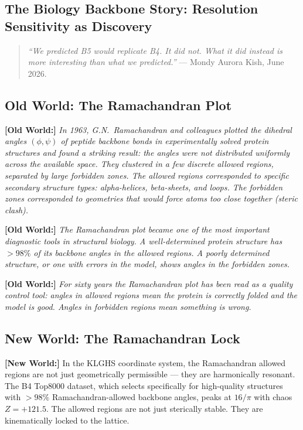 \documentclass[11pt, letterpaper, openany]{book}
\newcommand{\oldworld}[1]{\noindent\textbf{\color{goldseal}[Old World:]} \textit{#1}\medskip}
\newcommand{\newworld}[1]{\noindent\textbf{\color{kishblue}[New World:]} #1\medskip}
\begin{document}
\begin{empiricalbox}
\chapter{The Biology Backbone Story: Resolution Sensitivity as Discovery}

\begin{quote}
\textit{``We predicted B5 would replicate B4. It did not. What it did instead
is more interesting than what we predicted.''} --- Mondy Aurora Kish, June 2026.
\end{quote}

\section{Old World: The Ramachandran Plot}

\oldworld{In 1963, G.N.\ Ramachandran and colleagues plotted the dihedral angles
$(\phi, \psi)$ of peptide backbone bonds in experimentally solved protein
structures and found a striking result: the angles were not distributed
uniformly across the available space. They clustered in a few discrete allowed
regions, separated by large forbidden zones. The allowed regions corresponded
to specific secondary structure types: alpha-helices, beta-sheets, and loops.
The forbidden zones corresponded to geometries that would force atoms too
close together (steric clash).}

\oldworld{The Ramachandran plot became one of the most important diagnostic
tools in structural biology. A well-determined protein structure has
$>98\%$ of its backbone angles in the allowed regions. A poorly determined
structure, or one with errors in the model, shows angles in the forbidden
zones.}

\oldworld{For sixty years the Ramachandran plot has been read as a quality
control tool: angles in allowed regions mean the protein is correctly folded
and the model is good. Angles in forbidden regions mean something is wrong.}

\section{New World: The Ramachandran Lock}

\newworld{In the KLGHS coordinate system, the Ramachandran allowed regions are
not just geometrically permissible --- they are harmonically resonant.
The B4 Top8000 dataset, which selects specifically for high-quality structures
with $>98\%$ Ramachandran-allowed backbone angles, peaks at $16/\pi$ with
chaos $Z = +121.5$. The allowed regions are not just sterically stable.
They are kinematically locked to the lattice.}


\end{empiricalbox}
\end{document}
